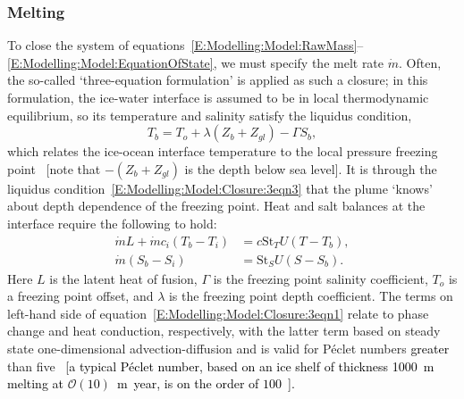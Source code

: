 \documentclass[openacc]{rsproca_new}%
\newcommand{\order}[1]{\mathcal{O}(#1)}
\newcommand{\red}[1]{{\color{red} #1}}
\newcommand{\blue}[1]{{\color{blue} #1}}
\newcommand{\rout}[1]{\red{\st{#1}}}\newcommand{\ab}[1]{\textcolor{Green}{#1}}\newcommand{\about}[1]{\textcolor{Cyan}{\sout{#1}}}
\renewcommand{\rout}[1]{{}} %
\renewcommand{\blue}[1]{{\textcolor{black}{#1}}} %
\renewcommand{\red}[1]{{}} %
\begin{document}
\begin{table}[!h]
\begin{center}
\begin{tabular}{llll}
\hline
\end{tabular}
\end{center}
\vspace*{-4pt}
\end{table}

\subsubsection{Melting}
To close the system of equations~\eqref{E:Modelling:Model:RawMass}--\eqref{E:Modelling:Model:EquationOfState}, we must specify the melt rate $\dot{m}$.  Often, the so-called `three-equation formulation' is applied as such a closure; in this formulation, the ice-water interface is assumed to be in local thermodynamic equilibrium, so its temperature and salinity satisfy the liquidus condition,
\begin{equation}
    T_b = T_o + \lambda (Z_{b} + Z_{gl}) - \Gamma S_b,\label{E:Modelling:Model:Closure:3eqn3}
\end{equation}
which relates the ice-ocean interface temperature to the local pressure freezing point~\cite{Holland1999JPhysOcean} [note that $-(Z_b + Z_{gl})$ is the depth below sea level]. It is through the liquidus condition~\eqref{E:Modelling:Model:Closure:3eqn3} that the plume `knows' about depth dependence of the freezing point. Heat and salt balances at the interface require the following to hold:
\begin{align}
\dot{m}L + \dot{m}c_i (T_b - T_i) &= c \mathrm{St}_T U(T - T_b),\label{E:Modelling:Model:Closure:3eqn1}\\
\dot{m}(S_b - S_i) &= \mathrm{St}_S U(S - S_b).\label{E:Modelling:Model:Closure:3eqn2}
\end{align}  
Here\rout{ $c, c_i$ are the specific heat capacities of water and ice, respectively,} $L$ is the latent heat of fusion, $\Gamma$ is the freezing point salinity coefficient,  $T_o$ is a freezing point offset, and $\lambda$ is the freezing point depth coefficient. The terms on left-hand side of equation~\eqref{E:Modelling:Model:Closure:3eqn1} relate to phase change and heat conduction, respectively, with the latter term based on steady state one-dimensional advection-diffusion and is valid for P\'{e}clet numbers\rout{ less} \blue{greater} than five~\cite{Holland1999JPhysOcean} \blue{[a typical P\'{e}clet number, based on an ice shelf of thickness 1000~m melting at $\order{10}$~m~year, is on the order of $100$~\cite{Holland1999JPhysOcean}].}
\end{document}
